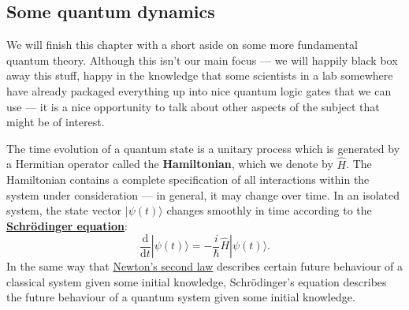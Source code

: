\documentclass[fleqn]{article}
\begin{document}
\hypertarget{some-quantum-dynamics}{%
\subsection{Some quantum dynamics}\label{some-quantum-dynamics}}

We will finish this chapter with a short aside on some more fundamental quantum theory.
Although this isn't our main focus --- we will happily black box away this stuff, happy in the knowledge that some scientists in a lab somewhere have already packaged everything up into nice quantum logic gates that we can use --- it is a nice opportunity to talk about other aspects of the subject that might be of interest.

The time evolution of a quantum state is a unitary process which is generated by a Hermitian operator called the \textbf{Hamiltonian}, which we denote by \(\hat{H}\).
The Hamiltonian contains a complete specification of all interactions within the system under consideration --- in general, it may change over time.
In an isolated system, the state vector \(|\psi(t)\rangle\) changes smoothly in time according to the \href{https://en.wikipedia.org/wiki/Schr\%C3\%B6dinger_equation}{\textbf{Schrödinger equation}}:
\[
  \frac{\mathrm{d}}{\mathrm{d}t} |\psi(t)\rangle
  =-\frac{i}{\hbar} \hat{H}|\psi(t)\rangle.
\]
In the same way that \href{https://en.wikipedia.org/wiki/Newton\%27s_laws_of_motion\%23Second}{Newton's second law} describes certain future behaviour of a classical system given some initial knowledge, Schrödinger's equation describes the future behaviour of a quantum system given some initial knowledge.
\end{document}
